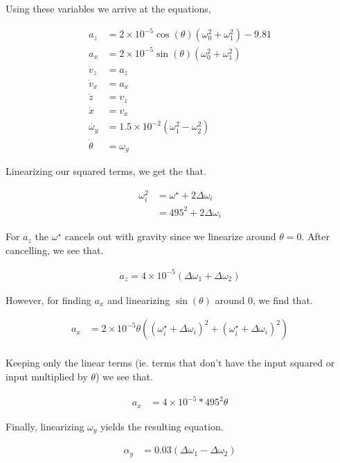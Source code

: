 \documentclass{article}
\begin{document}
    Using these variables we arrive at the equations,

    \begin{align}
        a_z &= 2\times 10^{-5} \cos(\theta) (\omega_0^2 + \omega_1^2)-9.81\\
        a_x &= 2\times 10^{-5} \sin(\theta) (\omega_0^2 + \omega_1^2)\\
        \dot{v}_z &= a_z\\
        \dot{v}_x &= a_x\\
        \dot{z} &= v_z\\
        \dot{x} &= v_x\\
        \dot{\omega_y} &= 1.5 \times 10^{-2}(\omega_1^2 - \omega_2^2)\\
        \dot{\theta} &= \omega_y
    \end{align}

    Linearizing our squared terms, we get the that.

    \begin{align}
        \omega_i^2 &= \omega^{\star} + 2\Delta \omega_i\\
        &= 495^2 + 2 \Delta \omega_i
    \end{align}

    For $a_z$ the $\omega^{\star}$ cancels out with gravity since we linearize around $\theta = 0$.
    After cancelling, we see that.

    \begin{align}
        a_z = 4 \times 10^{-5} (\Delta \omega_1 + \Delta \omega_2)
    \end{align}

    However, for finding $a_x$ and linearizing $\sin(\theta)$ around 0, we find that.

    \begin{align}
        a_x &= 2 \times 10^{-5} \theta((\omega_i^{\star} + \Delta \omega_i)^2 + (\omega_i^{\star} + \Delta \omega_i)^2)\\
    \end{align}

    Keeping only the linear terms (ie.
    terms that don't have the input squared or input multiplied by $\theta$) we see that.

    \begin{align}
        a_x &= 4 \times 10^{-5} * 495^2 \theta
    \end{align}

    Finally, linearizing $\omega_y$ yields the resulting equation.

    \begin{align}
        \alpha_y &= 0.03(\Delta \omega_1 - \Delta \omega_2)
    \end{align}
\end{document}
